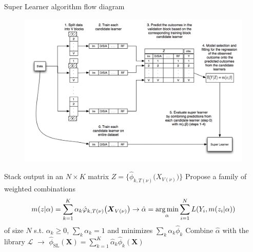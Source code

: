 
\begin{frame}{Super Learner algorithm flow diagram}

\begin{figure}
	\includegraphics[width=\textwidth]{./Figures/sup-learn.jpg}
\end{figure}

\end{frame}

\begin{frame}[fragile]%

{%
\setlength{\interspacetitleruled}{0pt}%
\setlength{\algotitleheightrule}{0pt}%
\begin{algorithm}[H]
Stack output in an $N\times K$ matrix
$Z=\bigl\{\hat{\phi}_{k,T(\nu)}\bigl(X_{V(\nu)}\bigr)\bigr\}$\;
Propose a family of weighted combinations\vspace{-1em}
\[
m(z\rvert\alpha)=\sum_{k=1}^K\alpha_k\hat{\phi}_{k,T(\nu)}\bigl(\boldsymbol{X}_{V(\nu)}\bigr)
\rightarrow
\hat{\alpha}=\argmin_\alpha\sum_{i=1}^NL(Y_i,m(z_i\rvert\alpha))
\vspace*{-1em}\]
of size $N$ s.t. $\alpha_k\geq0$, $\sum_k\alpha_k=1$ and minimizes $\sum_k\alpha_k\hat{\phi}_k$\;
Combine $\hat{\alpha}$ with the library $\hat{\mathcal{L}}$ $\rightarrow$ 
$\hat{\phi}_{\text{SL}}(\boldsymbol{X})=\sum_{k=1}^K\hat{\alpha}_k\hat{\phi}_k(\boldsymbol{X})$\;
\end{algorithm}}

\end{frame}
